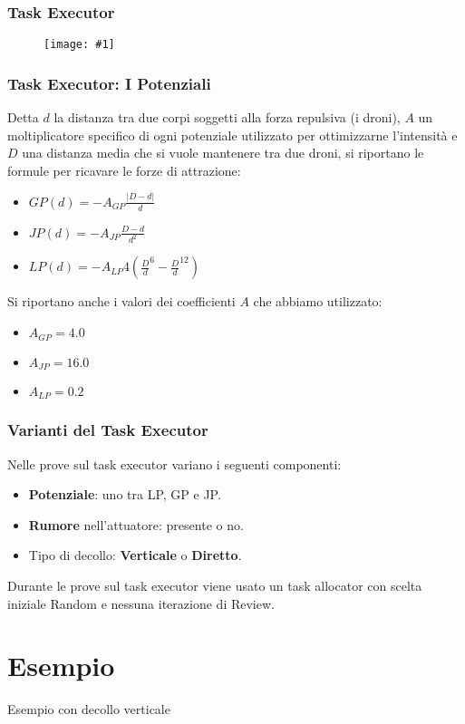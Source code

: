 \documentclass{beamer}
\newcommand{\putimage}[2] {
  \begin{figure}[H]
    \centering
    \texttt{[image: \#1]}
	\end{figure}
}
\begin{document}
\begin{frame}
\frametitle{Task Executor}
\putimage{images/task-executor.png}{0.99}
\end{frame}

\begin{frame}
\frametitle{Task Executor: I Potenziali}
Detta $d$ la distanza tra due corpi soggetti alla forza repulsiva (i droni), $A$ un moltiplicatore specifico di ogni potenziale utilizzato per ottimizzarne l'intensit\`a e $D$ una distanza media che si vuole mantenere tra due droni, si riportano le formule per ricavare le forze di attrazione:

\begin{itemize}
  \item $GP(d) = -A_{GP} \frac {|D - d|} {d}$
  \item $JP(d) = -A_{JP} \frac {D - d} {d^2}$
  \item $LP(d) = -A_{LP} 4 ({\frac {D} {d}}^6 - {\frac {D} {d}}^{12})$
\end{itemize}

Si riportano anche i valori dei coefficienti $A$ che abbiamo utilizzato:

\begin{itemize}
  \item $A_{GP} = 4.0$
  \item $A_{JP} = 16.0$
  \item $A_{LP} = 0.2$
\end{itemize}
\end{frame}

\begin{frame}
\frametitle{Varianti del Task Executor}
Nelle prove sul task executor variano i seguenti componenti:

\begin{itemize}
  \item \textbf{Potenziale}: uno tra LP, GP e JP.
  \item \textbf{Rumore} nell'attuatore: presente o no.
  \item Tipo di decollo: \textbf{Verticale} o \textbf{Diretto}.
\end{itemize}

Durante le prove sul task executor viene usato un task allocator con scelta iniziale Random e nessuna iterazione di Review.
\end{frame}

\section{Esempio}
\begin{frame}
\centering
\Huge
Esempio con decollo verticale
\end{frame}
\end{document}
